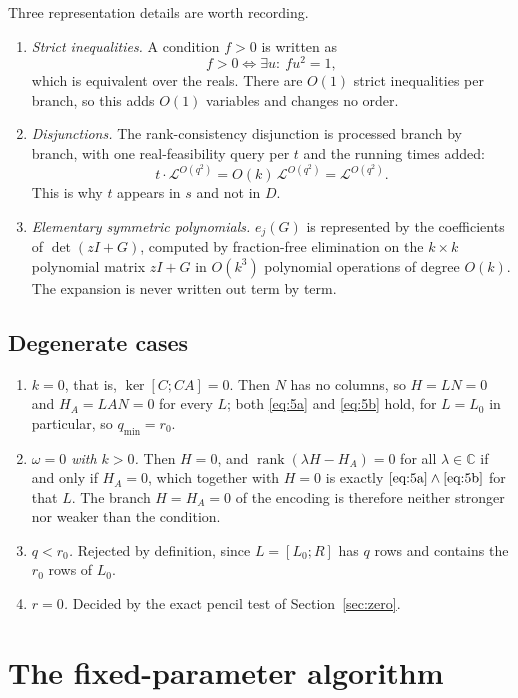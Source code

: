 \documentclass[journal]{IEEEtran}
\theoremstyle{plainn}
\theoremstyle{remark}
\begin{document}
Three representation details are worth recording.

\begin{enumerate}
\item \emph{Strict inequalities.} A condition $f>0$ is written as
\[
f>0\iff\exists u:\ fu^2=1,
\]
which is equivalent over the reals. There are $O(1)$ strict inequalities per
branch, so this adds $O(1)$ variables and changes no order.
\item \emph{Disjunctions.} The rank-consistency disjunction is processed branch
by branch, with one real-feasibility query per $t$ and the running times
added:
\[
t\cdot\mathcal L^{O(q^2)}=O(k)\,\mathcal L^{O(q^2)}=\mathcal L^{O(q^2)} .
\]
This is why $t$ appears in $s$ and not in $D$.
\item \emph{Elementary symmetric polynomials.} $e_j(G)$ is represented by the
coefficients of $\det(zI+G)$, computed by fraction-free elimination on the
$k\times k$ polynomial matrix $zI+G$ in $O(k^3)$ polynomial operations of
degree $O(k)$. The expansion is never written out term by term.
\end{enumerate}

\subsection{Degenerate cases}\label{sec:deg}

\begin{enumerate}
\item \emph{$k=0$}, that is, $\ker[C;CA]=0$. Then $N$ has no columns, so $H=LN=0$ and
$H_A=LAN=0$ for every $L$; both \eqref{eq:5a} and \eqref{eq:5b} hold, for $L=L_0$ in particular, so
$q_{\min}=r_0$.
\item \emph{$\omega=0$ with $k>0$.} Then $H=0$, and
$\operatorname{rank}(\lambda H-H_A)=0$ for all $\lambda\in\mathbb C$ if and only if $H_A=0$,
which together with $H=0$ is exactly $\eqref{eq:5a}\wedge\eqref{eq:5b}$ for
that $L$. The branch $H=H_A=0$ of the encoding is therefore neither stronger
nor weaker than the condition.
\item \emph{$q<r_0$.} Rejected by definition, since $L=[L_0;R]$ has $q$ rows
and contains the $r_0$ rows of $L_0$.
\item \emph{$r=0$.} Decided by the exact pencil test of Section~\ref{sec:zero}.
\end{enumerate}

\section{The fixed-parameter algorithm}\label{sec:fpt}
\end{document}
